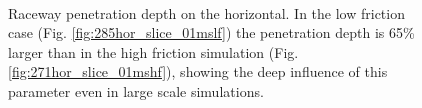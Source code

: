\begin{figure}[htbp]
\centering 
  \quad
  \quad
  \\
  \caption{Raceway penetration depth on the horizontal. In the low friction
  case (Fig. \ref{fig:285hor_slice_01mslf}) the penetration depth is 65\% 
  larger than in the high friction simulation (Fig.
  \ref{fig:271hor_slice_01mshf}), showing the deep influence of this parameter
  even in large scale simulations.}
  \label{fig:286hor_slice_01ms}
\end{figure}
